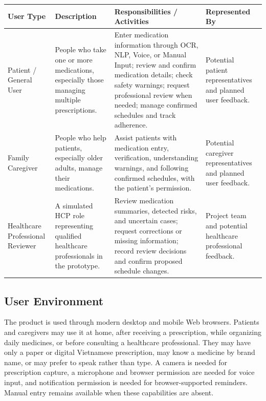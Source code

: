 \begin{longtable}{|L{0.18\textwidth}|L{0.23\textwidth}|L{0.31\textwidth}|L{0.18\textwidth}|}
\hline
\textbf{User Type} &
\textbf{Description} &
\textbf{Responsibilities / Activities} &
\textbf{Represented By}\\ \hline

Patient / General User
& People who take one or more medications,
especially those managing multiple prescriptions.
& Enter medication information through OCR,
NLP, Voice, or Manual Input; review and confirm
medication details; check safety warnings;
request professional review when needed;
manage confirmed schedules and track adherence.
& Potential patient representatives and
planned user feedback.
\\ \hline

Family Caregiver
& People who help patients, especially older
adults, manage their medications.
& Assist patients with medication entry,
verification, understanding warnings,
and following confirmed schedules,
with the patient's permission.
& Potential caregiver representatives
and planned user feedback.
\\ \hline

Healthcare Professional Reviewer
& A simulated HCP role representing qualified
healthcare professionals in the prototype.
& Review medication summaries, detected risks,
and uncertain cases; request corrections
or missing information; record review decisions
and confirm proposed schedule changes.
& Project team and potential
healthcare professional feedback.
\\ \hline

\end{longtable}


\subsection{User Environment}

The product is used through modern desktop and mobile Web browsers. Patients
and caregivers may use it at home, after receiving a prescription, while
organizing daily medicines, or before consulting a healthcare professional.
They may have only a paper or digital Vietnamese prescription, may know a
medicine by brand name, or may prefer to speak rather than type. A camera is
needed for prescription capture, a microphone and browser permission are needed
for voice input, and notification permission is needed for browser-supported
reminders. Manual entry remains available when these capabilities are absent.

